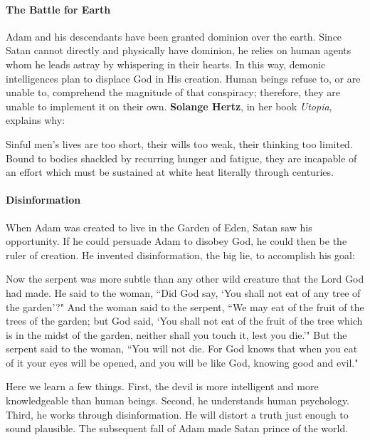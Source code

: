 \paragraph{The Battle for Earth}
Adam and his descendants have been granted dominion over the earth. Since Satan cannot directly and physically have dominion, he relies on human agents whom he leads astray by whispering in their hearts. In this way, demonic intelligences plan to displace God in His creation. Human beings refuse to, or are unable to, comprehend the magnitude of that conspiracy; therefore, they are unable to implement it on their own. \textbf{Solange Hertz}, in her book \emph{Utopia}, explains why:

\begin{quotex}
Sinful men's lives are too short, their wills too weak, their thinking too limited. Bound to bodies shackled by recurring hunger and fatigue, they are incapable of an effort which must be sustained at white heat literally through centuries.

\end{quotex}
\paragraph{Disinformation}
When Adam was created to live in the Garden of Eden, Satan saw his opportunity. If he could persuade Adam to disobey God, he could then be the ruler of creation. He invented disinformation, the big lie, to accomplish his goal:

\begin{quotex}
Now the serpent was more subtle than any other wild creature that the Lord God had made. He said to the woman, ``Did God say, `You shall not eat of any tree of the garden'?" And the woman said to the serpent, ``We may eat of the fruit of the trees of the garden; but God said, `You shall not eat of the fruit of the tree which is in the midst of the garden, neither shall you touch it, lest you die.'" But the serpent said to the woman, ``You will not die. For God knows that when you eat of it your eyes will be opened, and you will be like God, knowing good and evil." 

\end{quotex}
Here we learn a few things. First, the devil is more intelligent and more knowledgeable than human beings. Second, he understands human psychology. Third, he works through disinformation. He will distort a truth just enough to sound plausible. The subsequent fall of Adam made Satan prince of the world.

